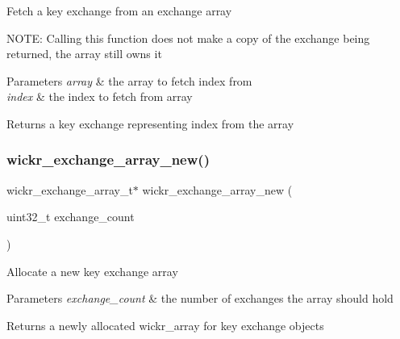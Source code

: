 Fetch a key exchange from an exchange array

N\+O\+TE\+: Calling this function does not make a copy of the exchange being returned, the array still owns it


\begin{DoxyParams}{Parameters}
{\em array} & the array to fetch \textquotesingle{}index\textquotesingle{} from \\
\hline
{\em index} & the index to fetch from \textquotesingle{}array\textquotesingle{} \\
\hline
\end{DoxyParams}
\begin{DoxyReturn}{Returns}
a key exchange representing \textquotesingle{}index\textquotesingle{} from the array 
\end{DoxyReturn}
\mbox{\label{group__wickr__protocol_ga907d700b76b748f80796b4404c7172c2}} 
\subsubsection{\texorpdfstring{wickr\+\_\+exchange\+\_\+array\+\_\+new()}{wickr\_exchange\_array\_new()}}
{\footnotesize\ttfamily wickr\+\_\+exchange\+\_\+array\+\_\+t$\ast$ wickr\+\_\+exchange\+\_\+array\+\_\+new (\begin{DoxyParamCaption}\item[{uint32\+\_\+t}]{exchange\+\_\+count }\end{DoxyParamCaption})}

Allocate a new key exchange array


\begin{DoxyParams}{Parameters}
{\em exchange\+\_\+count} & the number of exchanges the array should hold \\
\hline
\end{DoxyParams}
\begin{DoxyReturn}{Returns}
a newly allocated wickr\+\_\+array for key exchange objects 
\end{DoxyReturn}
\mbox{\label{group__wickr__protocol_gad3c6687c07ae5e66efcbc55da0febd85}} 
